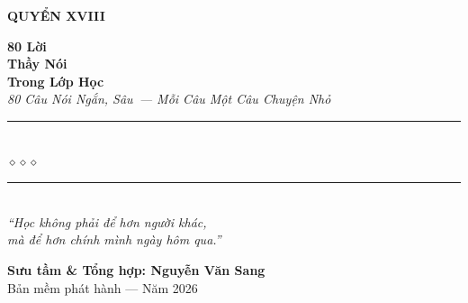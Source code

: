 \begin{titlepage}
\begin{center}
  \begin{tcolorbox}[
    width=6.5cm,
    colback=honeygold!20,
    colframe=honeygold!80!black,
    arc=4pt,
    boxrule=1.5pt,
    halign=center
  ]
    {\fontsize{18}{22}\selectfont\bfseries\color{inkdark!80!black}
     QUYỂN XVIII}
  \end{tcolorbox}
  \vspace{0.8cm}

  {\fontsize{28}{34}\selectfont\bfseries\color{inkdark!80!black}
    80 Lời}\\[0.4cm]
  {\fontsize{28}{34}\selectfont\bfseries\color{honeygold!80!black}
    Thầy Nói}\\[0.4cm]
  {\fontsize{28}{34}\selectfont\bfseries\color{inkdark!80!black}
    Trong Lớp Học}\\[0.4cm]

  {\fontsize{16}{20}\selectfont\color{honeygold!90!black}\itshape
    80 Câu Nói Ngắn, Sâu~--- Mỗi Câu Một Câu Chuyện Nhỏ}\\[1cm]

  {\color{edugreen!60}\rule{6cm}{1pt}}\\[5pt]
  {\color{honeygold!80!black}\large$\diamond$\hspace{1cm}$\diamond$\hspace{1cm}$\diamond$}\\[5pt]
  {\color{edugreen!60}\rule{6cm}{1pt}}\\[1.5cm]

  {\normalsize\itshape\color{edugreen!90!black}
   ``Học không phải để hơn người khác,\\
   mà để hơn chính mình ngày hôm qua.''}

  \vfill

  {\fontsize{16}{20}\selectfont\bfseries\color{edugreen!90!black}
    Sưu tầm \& Tổng hợp: \textbf{Nguyễn Văn Sang}}\\[0.4cm]

  {\small\color{gray} Bản mềm phát hành --- Năm 2026}\\[0.5cm]
\end{center}

\afterpage{\nopagecolor}
\end{titlepage}
